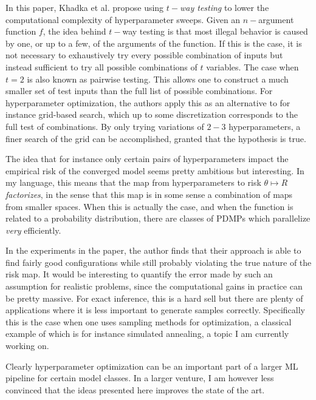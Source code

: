 \documentclass[11pt]{diazessay}
\begin{document}
In this paper, Khadka et al. propose using \textit{$t-$way testing} to lower the computational complexity of hyperparameter sweeps. Given an $n-$argument function $f$, the idea behind $t-$way testing is that most illegal behavior is caused by one, or up to a few, of the arguments of the function. If this is the case, it is not necessary to exhaustively try every possible combination of inputs but instead sufficient to try all possible combinations of $t$ variables. The case when $t=2$ is also known as pairwise testing. This allows one to construct a much smaller set of test inputs than the full list of possible combinations. For hyperparameter optimization, the authors apply this as an alternative to for instance grid-based search, which up to some discretization corresponds to the full test of combinations. By only trying variations of $2-3$ hyperparameters, a finer search of the grid can be accomplished, granted that the hypothesis is true.

The idea that for instance only certain pairs of hyperparameters impact the empirical risk of the converged model seems pretty ambitious but interesting. In my language, this means that the map from hyperparameters to risk $\theta \mapsto R$ \textit{factorizes}, in the sense that this map is in some sense a combination of maps from smaller spaces. When this is actually the case, and when the function is related to a probability distribution, there are classes of PDMPs which parallelize \textit{very} efficiently.

In the experiments in the paper, the author finds that their approach is able to find fairly good configurations while still probably violating the true nature of the risk map. It would be interesting to quantify the error made by such an assumption for realistic problems, since the computational gains in practice can be pretty massive. For exact inference, this is a hard sell but there are plenty of applications where it is less important to generate samples correctly. Specifically this is the case when one uses sampling methods for optimization, a classical example of which is for instance simulated annealing\cite{chiang1987}, a topic I am currently working on.

Clearly hyperparameter optimization can be an important part of a larger ML pipeline for certain model classes. In a larger venture, I am however less convinced that the ideas presented here improves the state of the art.



\end{document}
